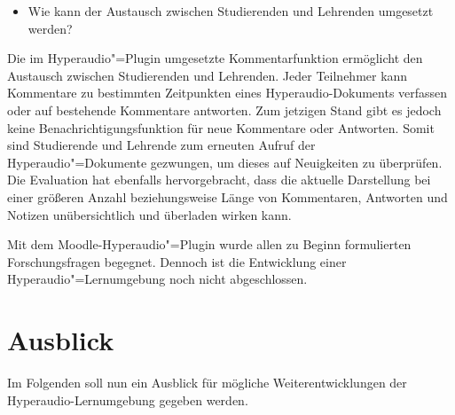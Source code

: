 \begin{itemize}
\item Wie kann der Austausch zwischen Studierenden und Lehrenden umgesetzt werden?
\end{itemize}
Die im Hyperaudio"=Plugin umgesetzte Kommentarfunktion ermöglicht den Austausch zwischen Studierenden und Lehrenden. Jeder Teilnehmer kann Kommentare zu bestimmten Zeitpunkten eines Hyperaudio-Dokuments verfassen oder auf bestehende Kommentare antworten. Zum jetzigen Stand gibt es jedoch keine Benachrichtigungsfunktion für neue Kommentare oder Antworten. Somit sind Studierende und Lehrende zum erneuten Aufruf der Hyperaudio"=Dokumente gezwungen, um dieses auf Neuigkeiten zu überprüfen. Die Evaluation hat ebenfalls hervorgebracht, dass die aktuelle Darstellung bei einer größeren Anzahl beziehungsweise Länge von Kommentaren, Antworten und Notizen unübersichtlich und überladen wirken kann.

Mit dem Moodle-Hyperaudio"=Plugin wurde allen zu Beginn formulierten Forschungsfragen begegnet. Dennoch ist die Entwicklung einer Hyperaudio"=Lernumgebung noch nicht abgeschlossen.
%

\section{Ausblick}

Im Folgenden soll nun ein Ausblick für mögliche Weiterentwicklungen der Hyperaudio-Lernumgebung gegeben werden.

